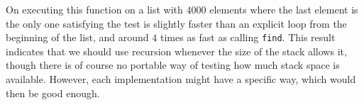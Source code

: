 On \sbcl{} executing this function on a list with $4000$ elements
where the last element is the only one satisfying the test is slightly
faster than an explicit loop from the beginning of the list, and
around $4$ times as fast as calling \texttt{find}.%
This result indicates that we should use recursion whenever the size
of the stack allows it, though there is of course no portable way of
testing how much stack space is available.  However, each
implementation might have a specific way, which would then be good
enough.
